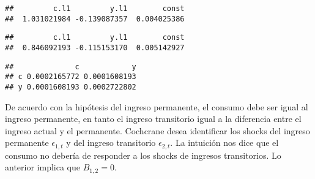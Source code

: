 \documentclass[
]{book}
\newenvironment{Shaded}{\begin{snugshade}}{\end{snugshade}}
\newcommand{\AttributeTok}[1]{\textcolor[rgb]{0.77,0.63,0.00}{#1}}
\newcommand{\ConstantTok}[1]{\textcolor[rgb]{0.00,0.00,0.00}{#1}}
\newcommand{\DecValTok}[1]{\textcolor[rgb]{0.00,0.00,0.81}{#1}}
\newcommand{\FunctionTok}[1]{\textcolor[rgb]{0.00,0.00,0.00}{#1}}
\newcommand{\NormalTok}[1]{#1}
\newcommand{\OtherTok}[1]{\textcolor[rgb]{0.56,0.35,0.01}{#1}}
\newcommand{\SpecialCharTok}[1]{\textcolor[rgb]{0.00,0.00,0.00}{#1}}
\newcommand{\StringTok}[1]{\textcolor[rgb]{0.31,0.60,0.02}{#1}}
\begin{document}
\begin{verbatim}
##         c.l1         y.l1        const 
##  1.031021984 -0.139087357  0.004025386
\end{verbatim}

\begin{Shaded}
\end{Shaded}

\begin{verbatim}
##         c.l1         y.l1        const 
##  0.846092193 -0.115153170  0.005142927
\end{verbatim}

\begin{Shaded}
\end{Shaded}

\begin{verbatim}
##              c            y
## c 0.0002165772 0.0001608193
## y 0.0001608193 0.0002722802
\end{verbatim}

De acuerdo con la hipótesis del ingreso permanente, el consumo debe ser igual al ingreso permanente, en tanto el ingreso transitorio igual a la diferencia entre el ingreso actual y el permanente. Cochcrane desea identificar los shocks del ingreso permanente \(\epsilon_{1,t}\) y del ingreso transitorio \(\epsilon_{2,t}\). La intuición nos dice que el consumo no debería de responder a los shocks de ingresos transitorios. Lo anterior implica que \(B_{1,2}=0\).

\begin{Shaded}
\end{Shaded}
\end{document}
